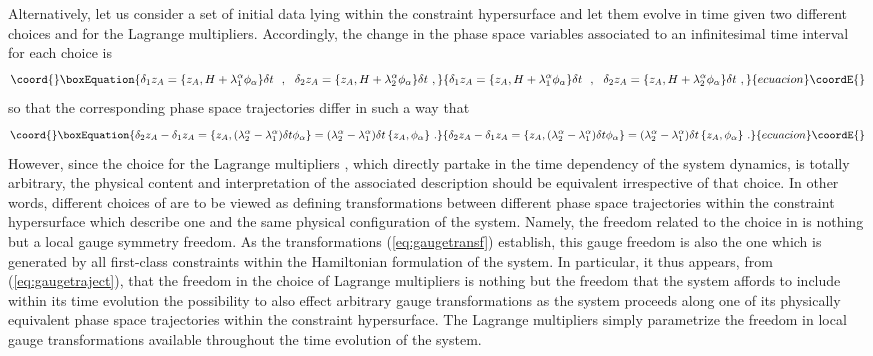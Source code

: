 \documentclass[a4paper,11pt]{article}
\begin{document}
Alternatively, let us consider a set of initial data lying within the
constraint hypersurface and let them evolve in time given two different
choices \coordHE{} and \coordHE{} for the Lagrange 
multipliers. Accordingly, the change in the phase space variables \coordHE{}
associated to an infinitesimal time interval \coordHE{} for each choice is
\begin{equation}\coord{}\boxEquation{
\delta_1z_A=\{z_A,H+\lambda^\alpha_1\phi_\alpha\}\delta t\ \ ,\ \ 
\delta_2z_A=\{z_A,H+\lambda^\alpha_2\phi_\alpha\}\delta t\ ,
}{
\delta_1z_A=\{z_A,H+\lambda^\alpha_1\phi_\alpha\}\delta t\ \ ,\ \ 
\delta_2z_A=\{z_A,H+\lambda^\alpha_2\phi_\alpha\}\delta t\ ,
}{ecuacion}\coordE{}\end{equation}
so that the corresponding phase space trajectories differ in such a way that
\begin{equation}\coord{}\boxEquation{
\delta_2z_A-\delta_1z_A=
\{z_A,(\lambda^\alpha_2-\lambda^\alpha_1)\delta t\phi_\alpha\}=
(\lambda^\alpha_2-\lambda^\alpha_1)\delta t\,\{z_A,\phi_\alpha\}\ .
\label{eq:gaugetraject}
}{
\delta_2z_A-\delta_1z_A=
\{z_A,(\lambda^\alpha_2-\lambda^\alpha_1)\delta t\phi_\alpha\}=
(\lambda^\alpha_2-\lambda^\alpha_1)\delta t\,\{z_A,\phi_\alpha\}\ .
}{ecuacion}\coordE{}\end{equation}
However, since the choice for the Lagrange multipliers \coordHE{},
which directly partake in the time dependency of the system dynamics, is
totally arbitrary, the physical content and interpretation of the
associated description should be equivalent irrespective of that choice.
In other words, different choices of \coordHE{} are to be viewed
as defining transformations between different phase space trajectories within
the constraint hypersurface which describe one and the same physical
configuration of the system. Namely, the freedom related to the choice
in \myHighlight{$\lambda^\alpha$}\coordHE{} is nothing but a local gauge symmetry freedom.
As the transformations (\ref{eq:gaugetransf}) establish, this gauge
freedom is also the one which is generated by all first-class constraints
within the Hamiltonian formulation of the system. In particular, it thus
appears, from (\ref{eq:gaugetraject}), that the freedom in the choice of
Lagrange multipliers \myHighlight{$\lambda^\alpha(t)$}\coordHE{} is nothing but the freedom that
the system affords to include within its time evolution the possibility
to also effect arbitrary gauge transformations as the system proceeds
along one of its physically equivalent phase space trajectories within
the constraint hypersurface. The Lagrange multipliers simply parametrize
the freedom in local gauge transformations available throughout the
time evolution of the system.
\end{document}
